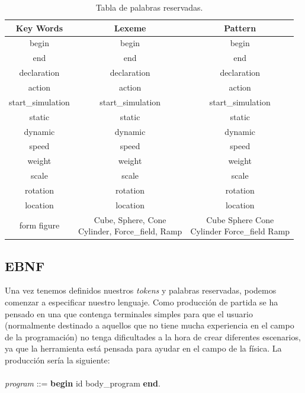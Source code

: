 \documentclass[12pt]{article}
\begin{document}
\begin{table}[h]
\centering
\begin{tabular}{| c | c | c |} \hline
\textbf{Key Words}          & \textbf{Lexeme} 													&  \textbf{Pattern} 		\\\hline
begin            			& begin     														& begin        				\\\hline
end             			& end      															& end        			    \\\hline
declaration           		& declaration       												& declaration        		\\\hline
action           			& action       														& action       			  	\\\hline
start\_simulation 			& start\_simulation       											& start\_simulation        	\\\hline
static						& static 															& static 					\\\hline
dynamic 					& dynamic 															& dynamic 					\\\hline
speed 						& speed 															& speed 					\\\hline
weight 						& weight 															& weight 					\\\hline
scale 						& scale 															& scale 					\\\hline
rotation					& rotation 															& rotation					\\\hline
location 					& location 															& location					\\\hline
form figure       			& \makecell{Cube, Sphere, Cone \\ Cylinder, Force\_field, Ramp}     & \makecell{Cube \textbar\space Sphere \textbar\space Cone \\ Cylinder \textbar\space Force\_field \textbar\space Ramp}        														  \\\hline
\end{tabular}
\caption{\label{tab:KeyWords}Tabla de palabras reservadas.}
\end{table}

\subsection{EBNF}

Una vez tenemos definidos nuestros \textit{tokens} y palabras reservadas, podemos comenzar a especificar nuestro lenguaje. Como producción de partida se ha pensado en una que contenga terminales simples para que el usuario (normalmente destinado a aquellos que no tiene mucha experiencia en el campo de la programación) no tenga dificultades a la hora de crear diferentes escenarios, ya que la herramienta está pensada para ayudar en el campo de la física. La producción sería la siguiente: \\ \\
\noindent \textit{program} ::= \textbf{begin} id body\_program \textbf{end}.
\end{document}
